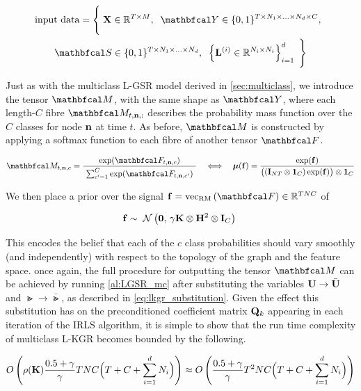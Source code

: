 \begin{multline*}
    \text{input data} = \Bigg\{\;\X \in \R^{T \times M}, \;\; \Yt \in \{0, 1\}^{T \times N_1 \times ... \times N_d \times C}, \;\; \\ 
    \St \in \{0, 1\}^{T \times N_1 \times ... \times N_d} , \;\; \left\{\LL^{(i)} \in \R^{N_i \times N_i}\right\}_{i=1}^d \; \Bigg\}
\end{multline*}

Just as with the multiclass L-GSR model derived in \cref{sec:multiclass}, we introduce the tensor $\Mt$, with the same shape as $\Yt$, where each length-$C$ fibre $\Mt_{t, \nn, :}$ describes the probability mass function over the $C$ classes for node $\mathbf{n}$ at time $t$. As before, $\Mt$ is constructed by applying a softmax function to each fibre of another tensor $\Ft$. 

\begin{equation}
    \label{eq:softmax2}
    \Mt_{t, \nn, c} = \frac{\exp(\Ft_{t, \nn, c})}{ \raisebox{-0.1cm} { $\sum_{c'=1}^C \exp(\Ft_{t, \nn, c'})$ }}  \quad \Longleftrightarrow \quad \muu(\f) = \frac{\exp(\f)}{ \big((\I_{NT} \otimes \one_C) \exp(\f)\big) \otimes \one_C}
\end{equation}

We then place a prior over the signal $\f = \vecrm{\Ft} \in \R^{TNC}$ of

\begin{equation}
    \mathbf{f} \sim \; \mathcal{N}\left(\mathbf{0}, \, \gamma \mathbf{K} \otimes \mathbf{H}^2 \otimes \mathbf{I}_C\right) \;
\end{equation}

This encodes the belief that each of the $c$ class probabilities should vary smoothly (and independently) with respect to the topology of the graph and the feature space. once again, the full procedure for outputting the tensor $\Mt$ can be achieved by running \cref{al:LGSR_mc} after substituting the variables $\mathbf{U} \rightarrow \bar{\mathbf{U}}$ and $\Gt \rightarrow \bar{\Gt}$, as described in \cref{eq:lkgr_substitution}. Given the effect this substitution has on the preconditioned coefficient matrix $\mathbf{Q}_k$ appearing in each iteration of the IRLS algorithm, it is simple to show that the run time complexity of multiclass L-KGR becomes bounded by the following. 

\begin{equation*}
    O\left(\rho(\mathbf{K}) \frac{0.5 + \gamma}{\gamma} TNC \Big(T + C + \sum_{i=1}^d N_i \Big)\right) \approx O\left(\frac{0.5 + \gamma}{\gamma} T^2NC \Big(T + C + \sum_{i=1}^d N_i \Big)\right)
\end{equation*}


